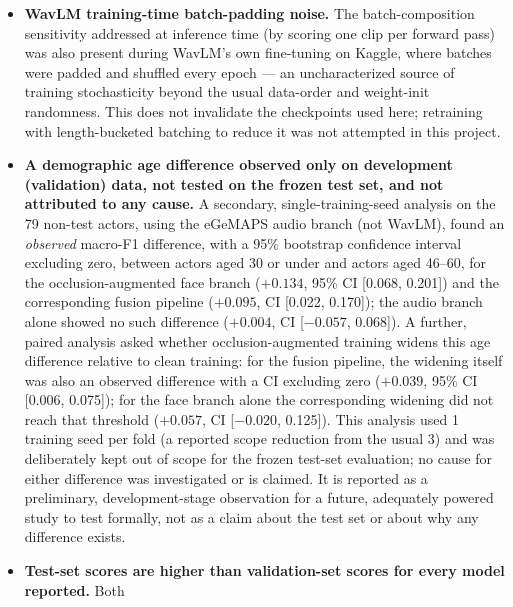 \documentclass[10pt]{article}
\begin{document}
\begin{itemize}
  (non-paired) intervals overlap each other even where the corresponding \emph{paired} comparison was
  significant (e.g., fixed-fusion and WavLM-alone absolute intervals on clean faces overlap, even though
  P1's paired test on the same data is significant). Paired comparisons, which exploit the correlation
  between two methods' scores on the same resampled actors, are more sensitive than comparing two
  independent intervals and are the basis for every significance claim in this report.
\item \textbf{WavLM training-time batch-padding noise.} The batch-composition sensitivity addressed at inference
  time (by scoring one clip per forward pass) was also present during WavLM's own fine-tuning on Kaggle,
  where batches were padded and shuffled every epoch --- an uncharacterized source of training stochasticity
  beyond the usual data-order and weight-init randomness. This does not invalidate the checkpoints used
  here; retraining with length-bucketed batching to reduce it was not attempted in this project.
\item \textbf{A demographic age difference observed only on development (validation) data, not tested on the
  frozen test set, and not attributed to any cause.} A secondary, single-training-seed analysis on the
  79 non-test actors, using the eGeMAPS audio branch (not WavLM), found an \emph{observed} macro-F1
  difference, with a 95\% bootstrap confidence interval excluding zero, between actors aged 30 or under
  and actors aged 46--60, for the
  occlusion-augmented face branch ($+0.134$, 95\% CI [0.068, 0.201]) and the corresponding fusion pipeline
  ($+0.095$, CI [0.022, 0.170]); the audio branch alone showed no such difference ($+0.004$, CI
  [$-0.057$, 0.068]). A further, paired analysis asked whether occlusion-augmented training widens this age
  difference relative to clean training: for the fusion pipeline, the widening itself was also an observed
  difference with a CI excluding zero ($+0.039$, 95\% CI [0.006, 0.075]); for the face branch alone the
  corresponding widening did not reach that threshold ($+0.057$, CI [$-0.020$, 0.125]). This analysis used 1
  training seed per fold (a reported scope reduction from the usual 3) and was deliberately kept out of
  scope for the frozen test-set evaluation; no cause for either difference was investigated or is claimed.
  It is reported as a preliminary, development-stage observation for a future, adequately powered study to
  test formally, not as a claim about the test set or about why any difference exists.
\item \textbf{Test-set scores are higher than validation-set scores for every model reported.} Both

\end{itemize}
\end{document}
